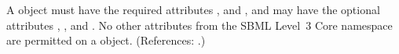A \Reaction object must have the required attributes ,
 and  , and may have the optional attributes
, ,  and .  No
other attributes from the SBML Level~3 Core namespace are permitted on a
\Reaction object.  (References: .)
